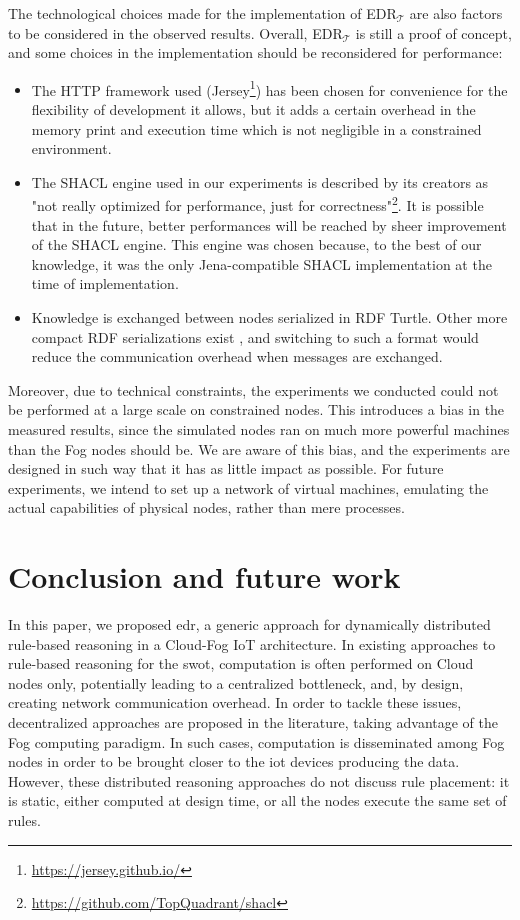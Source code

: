 \documentclass{iosart2c}
\newcommand{\edrt}{EDR$_{\mathcal{T}}$\xspace}
\begin{document}
The technological choices made for the implementation of \edrt are also factors to be considered in the observed results. 
Overall, \edrt is still a proof of concept, and some choices in the implementation should be reconsidered for performance: 
\begin{itemize}
	\item The HTTP framework used (Jersey\footnote{\url{https://jersey.github.io/}}) has been chosen for convenience for the flexibility of development it allows, but it adds a certain overhead in the memory print and execution time which is not negligible in a constrained environment.
	\item The SHACL engine used in our experiments is described by its creators as "not really optimized for performance, just for correctness"\footnote{\url{https://github.com/TopQuadrant/shacl}}.
	It is possible that in the future, better performances will be reached by sheer improvement of the SHACL engine.
	This engine was chosen because, to the best of our knowledge, it was the only Jena-compatible SHACL implementation at the time of implementation.
	\item Knowledge is exchanged between nodes serialized in RDF Turtle. 
	Other more compact RDF serializations exist \cite{Su2015}, and switching to such a format would reduce the communication overhead when messages are exchanged.
\end{itemize}

Moreover, due to technical constraints, the experiments we conducted could not be performed at a large scale on constrained nodes.
This introduces a bias in the measured results, since the simulated nodes ran on much more powerful machines than the Fog nodes should be. 
We are aware of this bias, and the experiments are designed in such way that it has as little impact as possible.
For future experiments, we intend to set up a network of virtual machines, emulating the actual capabilities of physical nodes, rather than mere processes.

\section{Conclusion and future work}
\label{sec:conclusion}

In this paper, we proposed \gls{edr}, a generic approach for dynamically distributed rule-based reasoning in a Cloud-Fog IoT architecture.
In existing approaches to rule-based reasoning for the \gls{swot}, computation is often performed on Cloud nodes only, potentially leading to a centralized bottleneck, and, by design, creating network communication overhead.
In order to tackle these issues, decentralized approaches are proposed in the literature, taking advantage of the Fog computing paradigm. 
In such cases, computation is disseminated among Fog nodes in order to be brought closer to the \gls{iot} devices producing the data.
However, these distributed reasoning approaches do not discuss rule placement: it is static, either computed at design time, or all the nodes execute the same set of rules.
\end{document}
